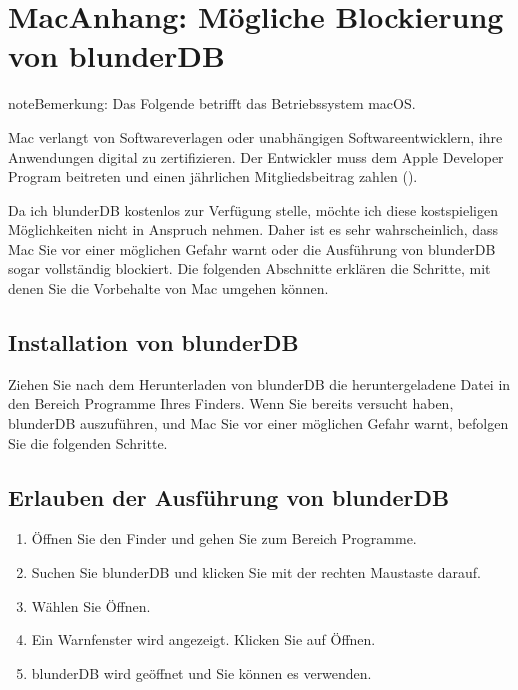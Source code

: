 \documentclass[letterpaper,10pt,german]{sphinxmanual}
\begin{document}
\sphinxstepscope


\section{Mac\sphinxhyphen{}Anhang: Mögliche Blockierung von blunderDB}
\label{\detokenize{annexe_mac_securite:annexe-mac-blocage-eventuel-de-blunderdb}}\label{\detokenize{annexe_mac_securite:annexe-mac-malware}}\label{\detokenize{annexe_mac_securite::doc}}
\begin{sphinxadmonition}{note}{Bemerkung:}
\sphinxAtStartPar
Das Folgende betrifft das Betriebssystem macOS.
\end{sphinxadmonition}

\sphinxAtStartPar
Mac verlangt von Softwareverlagen oder unabhängigen Softwareentwicklern, ihre Anwendungen digital zu zertifizieren. Der Entwickler muss dem Apple Developer Program beitreten und einen jährlichen Mitgliedsbeitrag zahlen ().

\sphinxAtStartPar
Da ich blunderDB kostenlos zur Verfügung stelle, möchte ich diese kostspieligen Möglichkeiten nicht in Anspruch nehmen. Daher ist es sehr wahrscheinlich, dass Mac Sie vor einer möglichen Gefahr warnt oder die Ausführung von blunderDB sogar vollständig blockiert. Die folgenden Abschnitte erklären die Schritte, mit denen Sie die Vorbehalte von Mac umgehen können.


\subsection{Installation von blunderDB}
\label{\detokenize{annexe_mac_securite:installation-de-blunderdb}}
\sphinxAtStartPar
Ziehen Sie nach dem Herunterladen von blunderDB die heruntergeladene Datei in den Bereich Programme Ihres Finders. Wenn Sie bereits versucht haben, blunderDB auszuführen, und Mac Sie vor einer möglichen Gefahr warnt, befolgen Sie die folgenden Schritte.


\subsection{Erlauben der Ausführung von blunderDB}
\label{\detokenize{annexe_mac_securite:autorisation-de-l-execution-de-blunderdb}}\begin{enumerate}
%
\item {} 
\sphinxAtStartPar
Öffnen Sie den Finder und gehen Sie zum Bereich Programme.

\item {} 
\sphinxAtStartPar
Suchen Sie blunderDB und klicken Sie mit der rechten Maustaste darauf.

\item {} 
\sphinxAtStartPar
Wählen Sie Öffnen.

\item {} 
\sphinxAtStartPar
Ein Warnfenster wird angezeigt. Klicken Sie auf Öffnen.

\item {} 
\sphinxAtStartPar
blunderDB wird geöffnet und Sie können es verwenden.

\end{enumerate}
\end{document}
